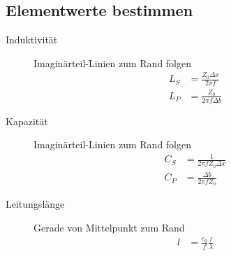 \subsection*{Elementwerte bestimmen}
\begin{description}
\item[Induktivität] Imaginärteil-Linien zum Rand folgen
\begin{align*}
L_S &= \frac{Z_0 \Delta x}{2\pi f} \\
L_P &= \frac{Z_0}{2\pi f \Delta b}
\end{align*}

\item[Kapazität] Imaginärteil-Linien zum Rand folgen
\begin{align*}
C_S &= \frac{1}{2\pi f Z_0 \Delta x} \\
C_P &= \frac{\Delta b}{2\pi f Z_0}
\end{align*}

\item[Leitungslänge] Gerade von Mittelpunkt zum Rand
\begin{align*}
l &= \frac{c_0}{f} \frac{l}{\lambda}
\end{align*}
\end{description}